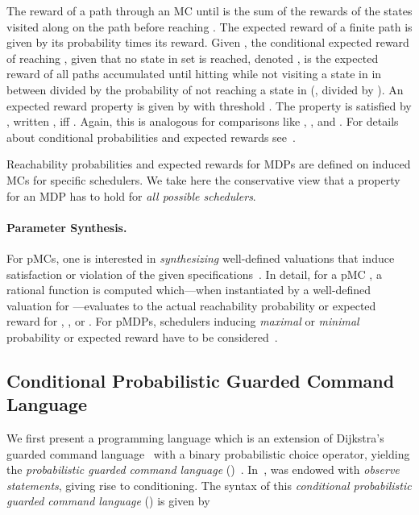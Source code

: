 The reward of a path through an MC  until  is the sum of the rewards of the states visited along on the path before reaching .
The expected reward of a finite path is given by its probability times its reward.
Given , the conditional expected reward of reaching , given that no state in set  is reached, denoted , is the expected reward of all paths accumulated until hitting  while not visiting a state in  in between divided by the probability of not reaching a state in  (\ie, divided by ).
An expected reward property is given by  with threshold .
The property is satisfied by , written , iff .
Again, this is analogous for comparisons like , , and .
For details about conditional probabilities and expected rewards see~\cite{DBLP:conf/tacas/BaierKKM14}. 

Reachability probabilities and expected rewards for MDPs are defined on induced MCs for specific schedulers. 
We take here the conservative view that a property for an MDP has to hold for \emph{all possible schedulers}. 

\paragraph{Parameter Synthesis.}
For pMCs, one is interested in \emph{synthesizing} well-defined valuations that induce satisfaction or violation of the given specifications~\cite{dehnert-et-al-cav-2015}. In detail, for a pMC , a rational function  is computed which---when instantiated by a well-defined valuation  for ---evaluates to the actual reachability probability or expected reward for , \ie,  or . For pMDPs, schedulers inducing \emph{maximal} or \emph{minimal} probability or expected reward have to be considered~\cite{quatmann-et-al-techreport-2016}.


\subsection{Conditional Probabilistic Guarded Command Language}

We first present a programming language which is an extension of Dijkstra's guarded command language~\cite{Dijkstra} with a binary probabilistic choice operator, yielding the 
\emph{probabilistic guarded command language} (\pGCL)~\cite{McIver:2004}. In~\cite{jansen-et-al-mfps-2015}, \pGCL was endowed with \emph{observe statements}, giving rise to conditioning. The syntax of this \emph{conditional probabilistic guarded command language} (\cpGCL) is given by

